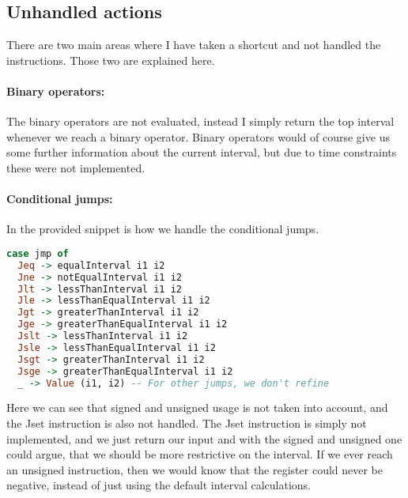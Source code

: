 \subsection{Unhandled actions}
There are two main areas where I have taken a shortcut and not handled the instructions. Those two are explained here.

\paragraph{Binary operators: } The binary operators are not evaluated, instead
I simply return the top interval whenever we reach a binary operator. Binary
operators would of course give us some further information about the current
interval, but due to time constraints these were not implemented.

\paragraph{Conditional jumps: } 
In the provided snippet is how we handle the conditional jumps.
\begin{lstlisting}[language={haskell}, numbers=none]
case jmp of
  Jeq -> equalInterval i1 i2
  Jne -> notEqualInterval i1 i2
  Jlt -> lessThanInterval i1 i2
  Jle -> lessThanEqualInterval i1 i2
  Jgt -> greaterThanInterval i1 i2
  Jge -> greaterThanEqualInterval i1 i2
  Jslt -> lessThanInterval i1 i2
  Jsle -> lessThanEqualInterval i1 i2
  Jsgt -> greaterThanInterval i1 i2
  Jsge -> greaterThanEqualInterval i1 i2
  _ -> Value (i1, i2) -- For other jumps, we don't refine
\end{lstlisting}

Here we can see that signed and unsigned usage is not taken into account, and
the Jset instruction is also not handled. The Jset instruction is simply not
implemented, and we just return our input and with the signed and unsigned one
could argue, that we should be more restrictive on the interval. If we ever
reach an unsigned instruction, then we would know that the register could never
be negative, instead of just using the default interval calculations.
